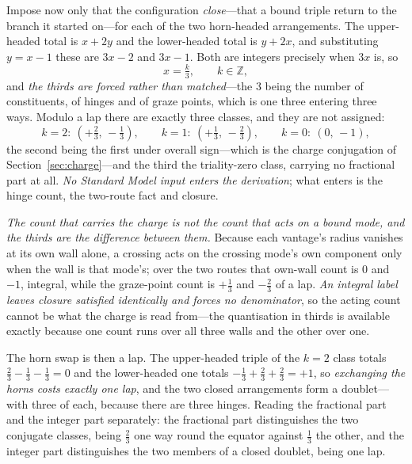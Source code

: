 \documentclass[11pt,a4paper]{article}
\theoremstyle{definition}
\begin{document}
Impose now only that the configuration \emph{close}---that a bound triple return to the branch it started on---for each of the two horn-headed arrangements. The upper-headed total is $x+2y$ and the lower-headed total is $y+2x$, and substituting $y=x-1$ these are $3x-2$ and $3x-1$. Both are integers precisely when $3x$ is, so
\begin{equation}\label{eq:thirds}
x=\tfrac{k}{3},\qquad k\in\mathbb{Z},
\end{equation}
and \emph{the thirds are forced rather than matched}---the $3$ being the number of constituents, of hinges and of graze points, which is one three entering three ways. Modulo a lap there are exactly three classes, and they are not assigned:
\[
k=2:\ \left(+\tfrac23,\,-\tfrac13\right),\qquad
k=1:\ \left(+\tfrac13,\,-\tfrac23\right),\qquad
k=0:\ \left(0,\,-1\right),
\]
the second being the first under overall sign---which is the charge conjugation of Section~\ref{sec:charge}---and the third the triality-zero class, carrying no fractional part at all. \emph{No Standard Model input enters the derivation}; what enters is the hinge count, the two-route fact and closure.

\emph{The count that carries the charge is not the count that acts on a bound mode, and the thirds are the difference between them.} Because each vantage's radius vanishes at its own wall alone, a crossing acts on the crossing mode's own component only when the wall is that mode's; over the two routes that own-wall count is $0$ and $-1$, integral, while the graze-point count is $+\tfrac13$ and $-\tfrac23$ of a lap. \emph{An integral label leaves closure satisfied identically and forces no denominator}, so the acting count cannot be what the charge is read from---the quantisation in thirds is available exactly because one count runs over all three walls and the other over one.

The horn swap is then a lap. The upper-headed triple of the $k=2$ class totals $\tfrac23-\tfrac13-\tfrac13=0$ and the lower-headed one totals $-\tfrac13+\tfrac23+\tfrac23=+1$, so \emph{exchanging the horns costs exactly one lap}, and the two closed arrangements form a doublet---with three of each, because there are three hinges. Reading the fractional part and the integer part separately: the fractional part distinguishes the two conjugate classes, being $\tfrac23$ one way round the equator against $\tfrac13$ the other, and the integer part distinguishes the two members of a closed doublet, being one lap.
\end{document}
